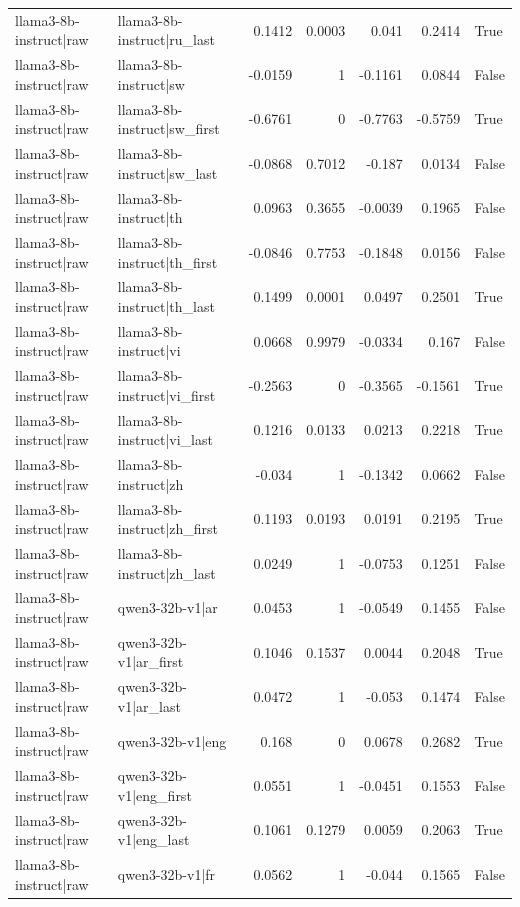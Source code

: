\begin{table}
\begin{tabular}{l l r r r r l}
llama3-8b-instruct|raw & llama3-8b-instruct|ru_last & 0.1412 & 0.0003 & 0.041 & 0.2414 & True \\
llama3-8b-instruct|raw & llama3-8b-instruct|sw & -0.0159 & 1 & -0.1161 & 0.0844 & False \\
llama3-8b-instruct|raw & llama3-8b-instruct|sw_first & -0.6761 & 0 & -0.7763 & -0.5759 & True \\
llama3-8b-instruct|raw & llama3-8b-instruct|sw_last & -0.0868 & 0.7012 & -0.187 & 0.0134 & False \\
llama3-8b-instruct|raw & llama3-8b-instruct|th & 0.0963 & 0.3655 & -0.0039 & 0.1965 & False \\
llama3-8b-instruct|raw & llama3-8b-instruct|th_first & -0.0846 & 0.7753 & -0.1848 & 0.0156 & False \\
llama3-8b-instruct|raw & llama3-8b-instruct|th_last & 0.1499 & 0.0001 & 0.0497 & 0.2501 & True \\
llama3-8b-instruct|raw & llama3-8b-instruct|vi & 0.0668 & 0.9979 & -0.0334 & 0.167 & False \\
llama3-8b-instruct|raw & llama3-8b-instruct|vi_first & -0.2563 & 0 & -0.3565 & -0.1561 & True \\
llama3-8b-instruct|raw & llama3-8b-instruct|vi_last & 0.1216 & 0.0133 & 0.0213 & 0.2218 & True \\
llama3-8b-instruct|raw & llama3-8b-instruct|zh & -0.034 & 1 & -0.1342 & 0.0662 & False \\
llama3-8b-instruct|raw & llama3-8b-instruct|zh_first & 0.1193 & 0.0193 & 0.0191 & 0.2195 & True \\
llama3-8b-instruct|raw & llama3-8b-instruct|zh_last & 0.0249 & 1 & -0.0753 & 0.1251 & False \\
llama3-8b-instruct|raw & qwen3-32b-v1|ar & 0.0453 & 1 & -0.0549 & 0.1455 & False \\
llama3-8b-instruct|raw & qwen3-32b-v1|ar_first & 0.1046 & 0.1537 & 0.0044 & 0.2048 & True \\
llama3-8b-instruct|raw & qwen3-32b-v1|ar_last & 0.0472 & 1 & -0.053 & 0.1474 & False \\
llama3-8b-instruct|raw & qwen3-32b-v1|eng & 0.168 & 0 & 0.0678 & 0.2682 & True \\
llama3-8b-instruct|raw & qwen3-32b-v1|eng_first & 0.0551 & 1 & -0.0451 & 0.1553 & False \\
llama3-8b-instruct|raw & qwen3-32b-v1|eng_last & 0.1061 & 0.1279 & 0.0059 & 0.2063 & True \\
llama3-8b-instruct|raw & qwen3-32b-v1|fr & 0.0562 & 1 & -0.044 & 0.1565 & False \\

\end{tabular}
\end{table}
